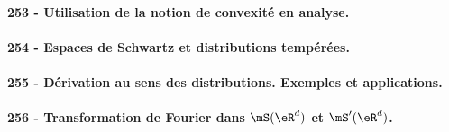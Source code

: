 \paragraph{253 - Utilisation de la notion de convexité en analyse.}
\paragraph{254 - Espaces de Schwartz et distributions tempérées.}
\paragraph{255 - Dérivation au sens des distributions. Exemples et applications.}
\paragraph{256 - Transformation de Fourier dans \( \mS(\eR^d)\) et \( \mS'(\eR^d)\).}

